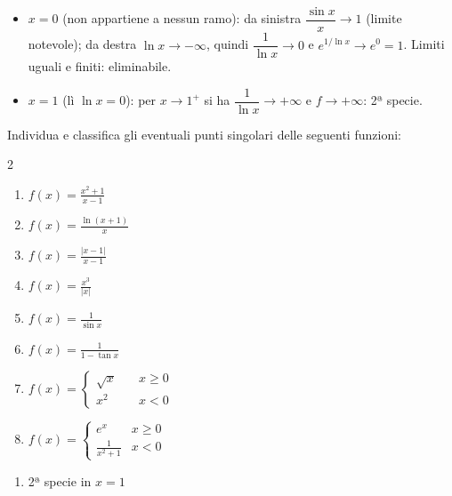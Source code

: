 \begin{question}[ID=2.1, subtitle={Punti singolari — serie 1}, tags={continuità, punti singolari}, difficulty=media]
\begin{explanation}
\begin{enumerate}[label=\arabic*)]
\begin{itemize}
        \item $x=0$ (non appartiene a nessun ramo): da sinistra $\dfrac{\sin x}{x}\to1$ (limite notevole); da destra $\ln x\to-\infty$, quindi $\dfrac{1}{\ln x}\to0$ e $e^{1/\ln x}\to e^0=1$. Limiti uguali e finiti: eliminabile.
        \item $x=1$ (lì $\ln x=0$): per $x\to1^+$ si ha $\dfrac{1}{\ln x}\to+\infty$ e $f\to+\infty$: 2ª specie.
    \end{itemize}
\end{enumerate}
\end{explanation}
\end{question}


\begin{question}[ID=2.2, subtitle={Punti singolari — serie 2}, tags={continuità, punti singolari}, difficulty=media]
Individua e classifica gli eventuali punti singolari delle seguenti funzioni:
\begin{center}\begin{minipage}{0.92\linewidth}
\begin{multicols}{2}
\begin{enumerate}[label=\arabic*),leftmargin=3.2cm]
\item $f(x) = \frac{x^2 + 1}{x - 1}$
\item $f(x) = \frac{\ln(x+1)}{x}$
\item $f(x) = \frac{|x-1|}{x-1}$
\item $f(x) = \frac{x^3}{|x|}$
\item $f(x) = \frac{1}{\sin x}$
\item $f(x) = \frac{1}{1-\tan x}$
\item $f(x) = \begin{cases} \sqrt{x} \quad & x \ge 0 \\ x^2 \quad & x < 0 \end{cases}$
\item $f(x) = \begin{cases} e^x & x \ge 0 \\ \frac{1}{x^2+1} & x < 0 \end{cases}$
\end{enumerate}
\end{multicols}
\end{minipage}\end{center}
\begin{solution}
\begin{enumerate}[label=\arabic*)]
    \item 2ª specie in $x=1$

\end{enumerate}
\end{solution}
\end{question}
